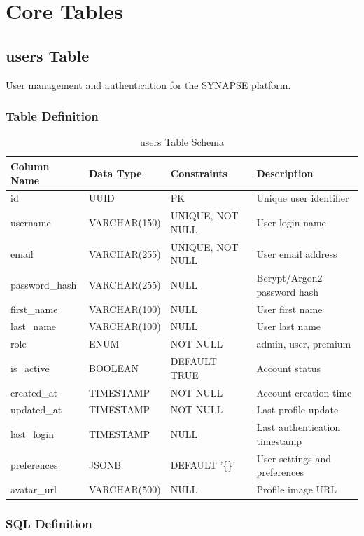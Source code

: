 \documentclass[12pt,a4paper]{report}
\begin{document}
\chapter{Core Tables}

\section{users Table}

User management and authentication for the SYNAPSE platform.

\subsection{Table Definition}

\begin{table}[h]
\centering
\small
\caption{users Table Schema}
\begin{tabular}{|l|l|l|l|}
\toprule
\textbf{Column Name} & \textbf{Data Type} & \textbf{Constraints} & \textbf{Description} \\
\midrule
id & UUID & PK & Unique user identifier \\
username & VARCHAR(150) & UNIQUE, NOT NULL & User login name \\
email & VARCHAR(255) & UNIQUE, NOT NULL & User email address \\
password\_hash & VARCHAR(255) & NULL & Bcrypt/Argon2 password hash \\
first\_name & VARCHAR(100) & NULL & User first name \\
last\_name & VARCHAR(100) & NULL & User last name \\
role & ENUM & NOT NULL & admin, user, premium \\
is\_active & BOOLEAN & DEFAULT TRUE & Account status \\
created\_at & TIMESTAMP & NOT NULL & Account creation time \\
updated\_at & TIMESTAMP & NOT NULL & Last profile update \\
last\_login & TIMESTAMP & NULL & Last authentication timestamp \\
preferences & JSONB & DEFAULT '\{\}' & User settings and preferences \\
avatar\_url & VARCHAR(500) & NULL & Profile image URL \\
\bottomrule
\end{tabular}
\end{table}

\subsection{SQL Definition}
\end{document}
